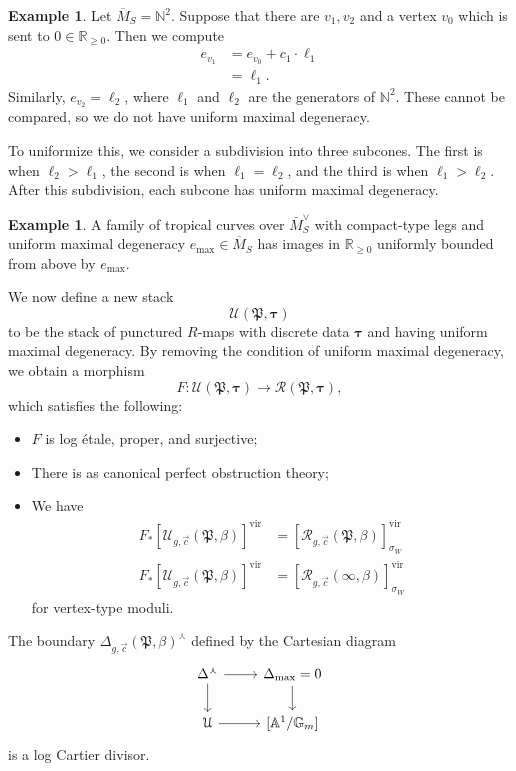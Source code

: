 \documentclass[10pt]{amsart}
\theoremstyle{definition}
\newtheorem{exm}[thm]{Example}
\theoremstyle{remark}
\theoremstyle{plain}
\theoremstyle{definition}
\theoremstyle{remark}
\newcommand{\A}{\mathbb{A}}
\newcommand{\G}{\mathbb{G}}
\newcommand{\N}{\mathbb{N}}
\newcommand{\R}{\mathbb{R}}
\newcommand{\mc}[1]{\mathcal{#1}}
\newcommand{\mf}[1]{\mathfrak{#1}}
\newcommand{\btau}{\bm{\tau}}
\newcommand{\mr}[1]{\mathrm{#1}}
\newcommand{\ol}[1]{\overline{#1}}
\newcommand{\1}{\mathbf{1}}
\newcommand{\2}{\mathbf{2}}
\newcommand{\3}{\mathbf{3}}
\newcommand{\vir}{\mr{vir}}
\begin{document}
\begin{exm}
    Let $\ol{M}_S = \N^2$. Suppose that there are $v_1, v_2$ and a vertex $v_0$ which is sent to $0 \in \R_{\geq 0}$. Then we compute
    \begin{align*}
        e_{v_1} &= e_{v_0} + c_1 \cdot \ell_1 \\
        &= \ell_1.
    \end{align*}
    Similarly, $e_{v_2} = \ell_2$, where $\ell_1$ and $\ell_2$ are the generators of $\N^2$. These cannot be compared, so we do not have uniform maximal degeneracy.

    To uniformize this, we consider a subdivision into three subcones. The first is when $\ell_2 > \ell_1$, the second is when $\ell_1 = \ell_2$, and the third is when $\ell_1 > \ell_2$. After this subdivision, each subcone has uniform maximal degeneracy.
\end{exm}

\begin{exm}
    A family of tropical curves over $\bar{M}_S^{\vee}$ with compact-type legs and uniform maximal degeneracy $e_{\max} \in \ol{M}_S$ has images in $\R_{\geq 0}$ uniformly bounded from above by $e_{\max}$.
\end{exm}

We now define a new stack
\[ \mc{U}(\mf{P}, \btau) \]
to be the stack of punctured $R$-maps with discrete data $\btau$ and having uniform maximal degeneracy. By removing the condition of uniform maximal degeneracy, we obtain a morphism
\[ F \colon \mc{U}(\mf{P}, \btau) \to \mc{R}(\mf{P}, \btau), \]
which satisfies the following:
\begin{itemize}
    \item $F$ is log \'etale, proper, and surjective;
    \item There is as canonical perfect obstruction theory;
    \item We have
        \begin{align*}
            F_* [ \mc{U}_{g, \vec{c}}(\mf{P}, \beta) ]^{\vir} &= [\mc{R}_{g,\vec{c}}(\mf{P}, \beta) ]^{\vir}_{\sigma_W} \\
            F_* [ \mc{U}_{g, \vec{c}}(\mf{P}, \beta) ]^{\vir} &= [\mc{R}_{g,\vec{c}}(\infty, \beta) ]^{\vir}_{\sigma_W}
        \end{align*}
        for vertex-type moduli.
\end{itemize}

The boundary $\Delta_{g, \vec{c}}(\mf{P}, \beta)^{\curlywedge}$ defined by the Cartesian diagram
\begin{equation*}
\begin{tikzcd}
    \Delta^{\curlywedge} \ar{r} \ar{d} & \Delta_{\max} = 0 \ar{d} \\
    \mc{U} \ar{r} & { [\A^1/\G_m] }
\end{tikzcd}
\end{equation*}
is a log Cartier divisor.
\end{document}

